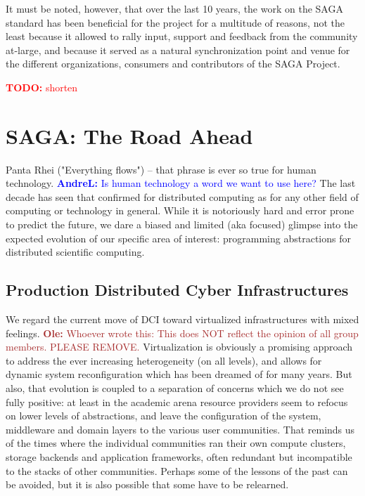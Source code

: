 \documentclass{article}
\newcommand{\B}[1]{\textbf{#1}}
\newcommand{\todo}[1]{{\textcolor{red}{\B{TODO:} #1 }}}
\newcommand{\alnote}[1]{{\textcolor{blue}{    \B{AndreL:  } #1 }}}
\newcommand{\ownote}[1]{{\textcolor{Brown}{   \B{Ole:     } #1 }}}
\newcommand{\todo}[1]{}
\newcommand{\alnote}[1]{}
\newcommand{\ownote}[1]{}
\begin{document}
  It must be noted, however, that over the last 10 years, the work on
  the SAGA standard has been beneficial for the project for a
  multitude of reasons, not the least because it allowed to rally
  input, support and feedback from the community at-large, and because
  it served as a natural synchronization point and venue for the
  different organizations, consumers and contributors of the SAGA
  Project.

  \todo{shorten}



\section{SAGA: The Road Ahead}
\label{sec:road}

 Panta Rhei ("Everything flows") -- that phrase is ever so true for
 human technology.\alnote{Is human technology a word we want to use here?}  
 The last decade has seen that confirmed for
 distributed computing as for any other field of computing or
 technology in general.  While it is notoriously hard and error prone
 to predict the future, we dare a biased and limited (aka focused)
 glimpse into the expected evolution of our specific area of interest:
 programming abstractions for distributed scientific computing. 


 \subsection{Production Distributed Cyber Infrastructures}


  We regard the current move of DCI toward virtualized infrastructures with
  mixed feelings. \ownote{Whoever wrote this: This does NOT reflect the opinion
  of all group members. PLEASE REMOVE.} Virtualization is obviously a promising
  approach to address the ever increasing heterogeneity (on all levels), and
  allows for dynamic system reconfiguration which has been dreamed of for many
  years.  But also, that evolution is coupled to a separation of concerns which
  we do not see fully positive: at least in the academic arena resource
  providers seem to refocus on lower levels of abstractions, and leave the
  configuration of the system, middleware and domain layers to the various user
  communities.  That reminds us of the times where the individual communities
  ran their own compute clusters, storage backends and application frameworks,
  often redundant but incompatible to the stacks of other communities.  Perhaps
  some of the lessons of the past can be avoided, but it is also possible that
  some have to be relearned.
\end{document}
